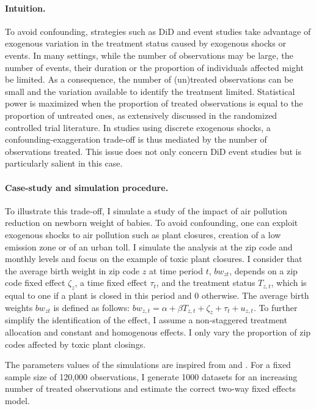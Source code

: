 \documentclass[usletter, 12pt]{article}
\begin{document}
        			\paragraph{Intuition.}  To avoid confounding, strategies such as DiD and event studies take advantage of exogenous variation in the treatment status caused by exogenous shocks or events. In many settings, while the number of observations may be large, the number of events, their duration or the proportion of individuals affected might be limited. As a consequence, the number of (un)treated observations can be small and the variation available to identify the treatment limited. Statistical power is maximized when the proportion of treated observations is equal to the proportion of untreated ones, as extensively discussed in the randomized controlled trial literature. In studies using discrete exogenous shocks, a confounding-exaggeration trade-off is thus mediated by the number of observations treated. This issue does not only concern DiD event studies but is particularly salient in this case. 
			
			\paragraph{Case-study and simulation procedure.} %
			To illustrate this trade-off, I simulate a study of the impact of air pollution reduction on newborn weight of babies. To avoid confounding, one can exploit exogenous shocks to air pollution such as plant closures, creation of a low emission zone or of an urban toll. I simulate the analysis at the zip code and monthly levels and focus on the example of toxic plant closures. I consider that the average birth weight in zip code $z$ at time period $t$, $bw_{zt}$, depends on a zip code fixed effect $\zeta_z$, a time fixed effect $\tau_t$, and the treatment status $T_{z,t}$, which is equal to one if a plant is closed in this period and 0 otherwise. The average birth weights $bw_{zt}$ is defined as follows: $bw_{z,t} = \alpha + \beta T_{z, t} + \zeta_z + \tau_t + u_{z,t}$. To further simplify the identification of the effect, I assume a non-staggered treatment allocation and constant and homogenous effects. I only vary the proportion of zip codes affected by toxic plant closings.

       The parameters values of the simulations are inspired from \cite{currie_environmental_2015} and \cite{lavaine_energy_2017}. For a fixed sample size of 120,000 observations, I generate 1000 datasets for an increasing number of treated observations and estimate the correct two-way fixed effects model.
        
\end{document}
